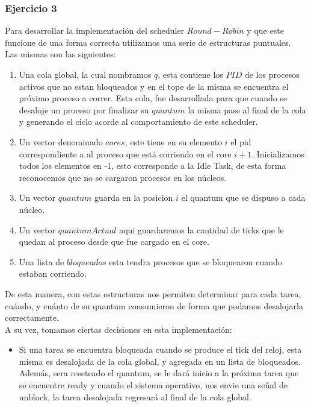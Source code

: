 \subsubsection[Resolución Ejercicio 3]{Ejercicio 3}
Para desarrollar la implementación del scheduler $Round-Robin$ y que este funcione de una forma correcta
utilizamos una serie de estructuras puntuales. \\
Las mismas son las siguientes:\\
\begin{enumerate}
 \item Una cola global, la cual nombramos $q$, esta contiene los $PID$ de los procesos activos que no estan
 bloqueados y en el tope de la misma se encuentra el próximo proceso a correr. Esta cola,
 fue desarrollada para que cuando se desaloje un proceso por finalizar su $quantum$ la misma pase al final de
 la cola y generando el ciclo acorde al comportamiento de este scheduler.
 \item Un vector denominado $cores$, este tiene en su elemento $i$ el pid correspondiente a
al proceso que está corriendo en el core $i+1$. Inicializamos todos los elementos en -1, esto
corresponde a la Idle Task, de esta forma reconocemos que no se cargaron procesos en los núcleos.
\item Un vector $quantum$ guarda en la posicion $i$ el quantum que se dispuso a cada núcleo.
\item Un vector $quantumActual$ aqui guardaremos la cantidad de ticks que le quedan al proceso
desde que fue cargado en el core.
\item Una lista de $bloqueados$ esta tendra procesos que se bloquearon cuando estaban corriendo.
\end{enumerate}

De esta manera, con estas estructuras nos permiten determinar para cada tarea, cuándo, y cuánto 
de su quantum consumieron de forma que podamos desalojarla correctamente.\\

A su vez, tomamos ciertas decisiones en esta implementación:
\begin{itemize}
 \item Si una tarea se encuentra bloqueada cuando se produce el tick del reloj, esta misma es desalojada
de la cola global, y agregada en un lista de bloqueados. Además, sera reseteado el quantum, se le
dará inicio a la próxima tarea que se encuentre ready y cuando el sistema operativo, nos envie una
señal de unblock, la tarea desalojada regresará al final de la cola global.

\end{itemize}


